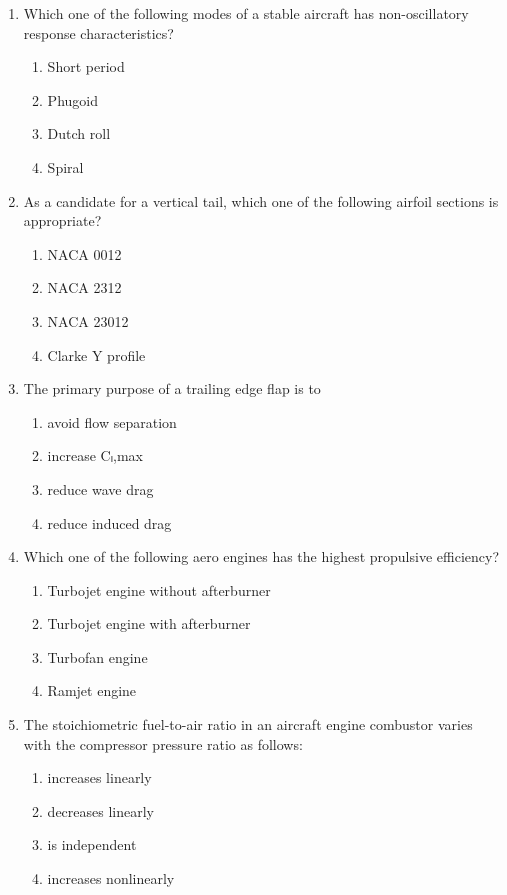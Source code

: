 \documentclass{article}
\begin{document}
\begin{enumerate}
\item Which one of the following modes of a stable aircraft has non-oscillatory response characteristics?
\begin{multicols}{4}
\begin{enumerate}
\item Short period
\item Phugoid
\item Dutch roll
\item Spiral
\end{enumerate}
\end{multicols}

\item As a candidate for a vertical tail, which one of the following airfoil sections is appropriate?

\begin{multicols}{4}
\begin{enumerate}
\item NACA 0012
\item NACA 2312
\item NACA 23012
\item Clarke Y profile 
\end{enumerate}
\end{multicols}

\item The primary purpose of a trailing edge flap is to

\begin{multicols}{4}
\begin{enumerate}
\item avoid flow separation
\item increase Cₗ,max
\item reduce wave drag
\item reduce induced drag
\end{enumerate}
\end{multicols}

\item Which one of the following aero engines has the highest propulsive efficiency?
\begin{enumerate}
\item Turbojet engine without afterburner
\item Turbojet engine with afterburner
\item Turbofan engine
\item Ramjet engine 
\end{enumerate}

\item The stoichiometric fuel-to-air ratio in an aircraft engine combustor varies with the compressor pressure ratio as follows:
\begin{multicols}{4}
\begin{enumerate}
\item increases linearly
\item decreases linearly
\item is independent
\item increases nonlinearly
\end{enumerate}
\end{multicols}


\end{enumerate}
\end{document}
